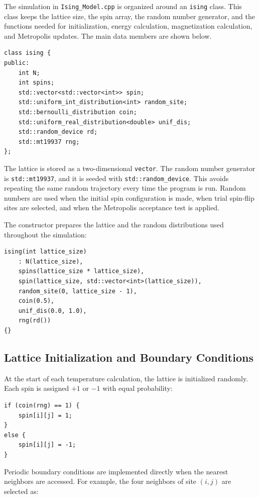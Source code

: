 \documentclass[11pt]{article}
\let\oldsubsection\subsection
\renewcommand{\subsection}[1]{\Needspace{2\baselineskip}\oldsubsection{#1}}
\begin{document}
The simulation in \texttt{Ising\_Model.cpp} is organized around an \texttt{ising} class. This class keeps the lattice size, the spin array, the random number generator, and the functions needed for initialization, energy calculation, magnetization calculation, and Metropolis updates. The main data members are shown below.

\begin{lstlisting}[style=cppstyle]
class ising {
public:
    int N;
    int spins;
    std::vector<std::vector<int>> spin;
    std::uniform_int_distribution<int> random_site;
    std::bernoulli_distribution coin;
    std::uniform_real_distribution<double> unif_dis;
    std::random_device rd;
    std::mt19937 rng;
};
\end{lstlisting}

The lattice is stored as a two-dimensional \texttt{vector}. The random number generator is \texttt{std::mt19937}, and it is seeded with \texttt{std::random\_device}. This avoids repeating the same random trajectory every time the program is run. Random numbers are used when the initial spin configuration is made, when trial spin-flip sites are selected, and when the Metropolis acceptance test is applied.

The constructor prepares the lattice and the random distributions used throughout the simulation:

\begin{lstlisting}[style=cppstyle]
ising(int lattice_size)
    : N(lattice_size),
    spins(lattice_size * lattice_size),
    spin(lattice_size, std::vector<int>(lattice_size)),
    random_site(0, lattice_size - 1),
    coin(0.5),
    unif_dis(0.0, 1.0),
    rng(rd())
{}
\end{lstlisting}

\subsection{Lattice Initialization and Boundary Conditions}

At the start of each temperature calculation, the lattice is initialized randomly. Each spin is assigned $+1$ or $-1$ with equal probability:

\begin{lstlisting}[style=cppstyle]
if (coin(rng) == 1) {
    spin[i][j] = 1;
}
else {
    spin[i][j] = -1;
}
\end{lstlisting}

Periodic boundary conditions are implemented directly when the nearest neighbors are accessed. For example, the four neighbors of site $(i,j)$ are selected as:
\end{document}
